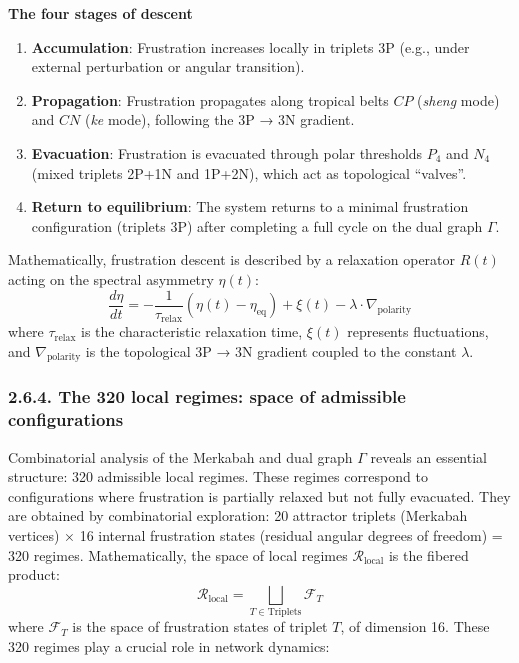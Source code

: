 \documentclass[11pt]{article}
\providecommand{\tightlist}{\setlength{\itemsep}{2pt}\setlength{\parskip}{6pt}}
\let\oldmathcal\mathcal
\renewcommand{\mathcal}[1]{\oldmathcal{#1}}
\providecommand{\tightlist}{%
  \setlength{\itemsep}{2pt}\setlength{\parskip}{6pt}
}
\begin{document}
\textbf{The four stages of descent}

\begin{enumerate}
\def\labelenumi{\arabic{enumi}.}
\tightlist
\item
  \textbf{Accumulation}: Frustration increases locally in triplets 3P
  (e.g., under external perturbation or angular transition).
\item
  \textbf{Propagation}: Frustration propagates along tropical belts
  \(CP\) (\textit{sheng} mode) and \(CN\) (\textit{ke} mode), following
  the 3P → 3N gradient.
\item
  \textbf{Evacuation}: Frustration is evacuated through polar thresholds
  \(P_4\) and \(N_4\) (mixed triplets 2P+1N and 1P+2N), which act as
  topological ``valves''.
\item
  \textbf{Return to equilibrium}: The system returns to a minimal
  frustration configuration (triplets 3P) after completing a full cycle
  on the dual graph \(\Gamma\).
\end{enumerate}

Mathematically, frustration descent is described by a relaxation
operator \(R(t)\) acting on the spectral asymmetry \(\eta(t)\): \[
\frac{d\eta}{dt} = -\frac{1}{\tau_{\text{relax}}} \left( \eta(t) - \eta_{\text{eq}} \right) + \xi(t) - \lambda \cdot \nabla_{\text{polarity}}
\] where \(\tau_{\text{relax}}\) is the characteristic relaxation time,
\(\xi(t)\) represents fluctuations, and \(\nabla_{\text{polarity}}\) is
the topological 3P → 3N gradient coupled to the constant \(\lambda\).

\hypertarget{the-320-local-regimes-space-of-admissible-configurations}{%
\subsubsection{2.6.4. The 320 local regimes: space of admissible
configurations}\label{the-320-local-regimes-space-of-admissible-configurations}}

Combinatorial analysis of the Merkabah and dual graph \(\Gamma\) reveals
an essential structure: 320 admissible local regimes. These regimes
correspond to configurations where frustration is partially relaxed but
not fully evacuated. They are obtained by combinatorial exploration: 20
attractor triplets (Merkabah vertices) × 16 internal frustration states
(residual angular degrees of freedom) = 320 regimes. Mathematically, the
space of local regimes \(\mathcal{R}_{\text{local}}\) is the fibered
product: \[
\mathcal{R}_{\text{local}} = \bigsqcup_{T \in \text{Triplets}} \mathcal{F}_T
\] where \(\mathcal{F}_T\) is the space of frustration states of triplet
\(T\), of dimension 16. These 320 regimes play a crucial role in network
dynamics:
\end{document}
